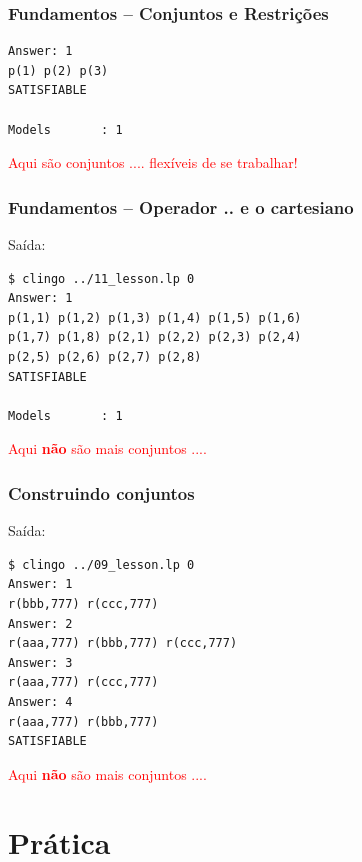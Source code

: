 \documentclass{beamer}
\begin{document}
\begin{frame}[fragile] 
	\frametitle{Fundamentos -- Conjuntos e Restrições}
	
	
\pause
{\small
\begin{verbatim}
Answer: 1
p(1) p(2) p(3)
SATISFIABLE

Models       : 1
\end{verbatim}
}
\textcolor{red}{Aqui são conjuntos .... flexíveis de se trabalhar!}	
\end{frame}
\begin{frame}[fragile] 
	\frametitle{Fundamentos -- Operador {\bf..} e o cartesiano}
	
	

Saída:
\pause
{\small
\begin{verbatim}
$ clingo ../11_lesson.lp 0
Answer: 1
p(1,1) p(1,2) p(1,3) p(1,4) p(1,5) p(1,6) 
p(1,7) p(1,8) p(2,1) p(2,2) p(2,3) p(2,4)
p(2,5) p(2,6) p(2,7) p(2,8)
SATISFIABLE

Models       : 1
\end{verbatim}
}	
\textcolor{red}{Aqui \textbf{não} são mais conjuntos .... }
\end{frame}


\begin{frame}[fragile] 
	\frametitle{Construindo conjuntos}
	
	

Saída:
\pause
{\small
\begin{verbatim}
$ clingo ../09_lesson.lp 0
Answer: 1
r(bbb,777) r(ccc,777)
Answer: 2
r(aaa,777) r(bbb,777) r(ccc,777)
Answer: 3
r(aaa,777) r(ccc,777)
Answer: 4
r(aaa,777) r(bbb,777)
SATISFIABLE
\end{verbatim}
}	
\textcolor{red}{Aqui \textbf{não} são mais conjuntos .... }
\end{frame}


\section{Prática}
\end{document}
